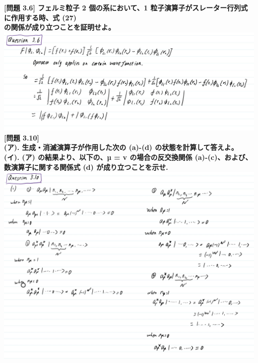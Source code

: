 \documentclass[11pt,largemargins]{homework}
\begin{document}
\newpage
\question
\textbf{[問題 3.6] フェルミ粒子 2 個の系において、1 粒子演算子がスレーター行列式に作用する時、式 (27)\\ の関係が成り立つことを証明せよ。}\\
\newline
\includegraphics[scale=0.5]{Question/Q3.6.jpg}
\newpage
\question
\textbf{[問題 3.10]\\(ア). 生成・消滅演算子が作用した次の (a)-(d) の状態を計算して答えよ。\\
(イ). (ア) の結果より、以下の、µ = v の場合の反交換関係 (a)-(c)、および、数演算子に関する関係式 (d) が成り立つことを示せ.}
\newline
\\
\includegraphics[scale=0.6]{Question/Q3.10-1.jpg}
\newline
\end{document}
